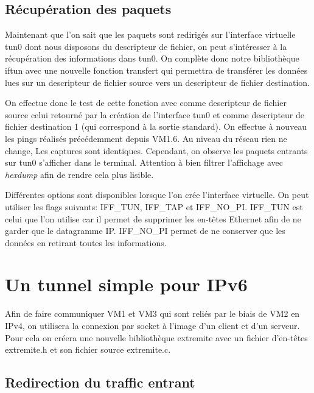 \documentclass[a4paper, 12pt]{article}
\begin{document}
    \subsection{Récupération des paquets}
    Maintenant que l'on sait que les paquets sont redirigés sur l'interface
    virtuelle tun0 dont nous disposons du descripteur de fichier, on peut 
    s'intéresser à la récupération des informations dans tun0. On complète
    donc notre bibliothèque iftun avec une nouvelle fonction transfert qui
    permettra de transférer les données lues sur un descripteur de fichier
    source vers un descripteur de fichier destination.

    \medbreak{}

    On effectue donc le test de cette fonction avec comme descripteur de 
    fichier source celui retourné par la création de l'interface tun0 et
    comme descripteur de fichier destination 1 (qui correspond à la 
    sortie standard). On effectue à nouveau les pings réalisés précédemment
    depuis VM1.6. Au niveau du réseau rien ne change, Les captures sont 
    identiques. Cependant, on observe les paquets entrants sur tun0 s'afficher
    dans le terminal. Attention à bien filtrer l'affichage avec 
    \textit{hexdump} afin de rendre cela plus lisible.

    \medbreak{}

    Différentes options sont disponibles lorsque l'on crée l'interface 
    virtuelle. On peut utiliser les flags suivants: IFF\_TUN, IFF\_TAP et
    IFF\_NO\_PI. IFF\_TUN est celui que l'on utilise car il permet de 
    supprimer les en-têtes Ethernet afin de ne garder que le datagramme IP.
    IFF\_NO\_PI permet de ne conserver que les données en retirant toutes 
    les informations.

    \section{Un tunnel simple pour IPv6}

    Afin de faire communiquer VM1 et VM3 qui sont reliés par le biais de VM2
    en IPv4, on utilisera la connexion par socket à l'image d'un client et 
    d'un serveur. Pour cela on créera une nouvelle bibliothèque extremite avec
    un fichier d'en-têtes extremite.h et son fichier source extremite.c.

    \subsection{Redirection du traffic entrant}
\end{document}

